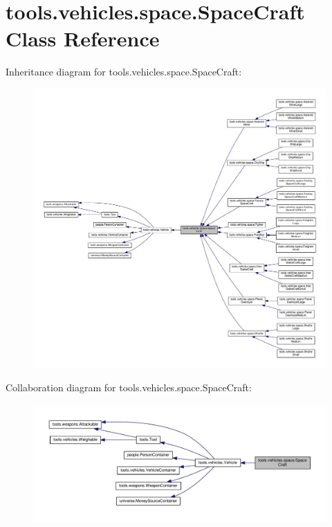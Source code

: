 \hypertarget{classtools_1_1vehicles_1_1space_1_1_space_craft}{}\section{tools.\+vehicles.\+space.\+Space\+Craft Class Reference}
\label{classtools_1_1vehicles_1_1space_1_1_space_craft}


Inheritance diagram for tools.\+vehicles.\+space.\+Space\+Craft\+:
\nopagebreak
\begin{figure}[H]
\begin{center}
\leavevmode
\includegraphics[width=350pt]{classtools_1_1vehicles_1_1space_1_1_space_craft__inherit__graph}
\end{center}
\end{figure}


Collaboration diagram for tools.\+vehicles.\+space.\+Space\+Craft\+:
\nopagebreak
\begin{figure}[H]
\begin{center}
\leavevmode
\includegraphics[width=350pt]{classtools_1_1vehicles_1_1space_1_1_space_craft__coll__graph}
\end{center}
\end{figure}
